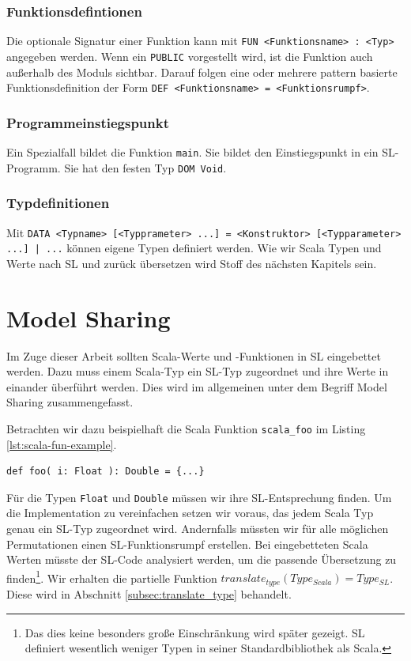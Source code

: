 \documentclass[12pt,bibtotoc]{scrreprt}
\begin{document}
\subsection{Funktionsdefintionen}

Die optionale Signatur einer Funktion kann mit \lstinline!FUN <Funktionsname> : <Typ>! angegeben werden. Wenn ein \lstinline!PUBLIC! vorgestellt wird, ist die Funktion auch außerhalb des Moduls sichtbar. Darauf folgen eine oder mehrere pattern basierte Funktionsdefinition der Form \lstinline!DEF <Funktionsname> = <Funktionsrumpf>!.


\subsection{Programmeinstiegspunkt}

Ein Spezialfall bildet die Funktion \lstinline!main!. Sie bildet den Einstiegspunkt in ein SL-Programm. Sie hat den festen Typ \lstinline!DOM Void!. 

\subsection{Typdefinitionen}

Mit \lstinline!DATA <Typname> [<Typprameter> ...] = <Konstruktor> [<Typparameter> ...] | ...! können eigene Typen definiert werden. Wie wir Scala Typen und Werte nach SL und zurück übersetzen wird Stoff des nächsten Kapitels sein.

\chapter{Model Sharing}
\label{cha:model-sharing}

Im Zuge dieser Arbeit sollten Scala-Werte und -Funktionen in SL eingebettet werden. Dazu muss einem Scala-Typ ein SL-Typ zugeordnet und ihre Werte in einander überführt werden. Dies wird im allgemeinen unter dem Begriff Model Sharing zusammengefasst.

Betrachten wir dazu beispielhaft die Scala Funktion \lstinline!scala_foo! im Listing \ref{lst:scala-fun-example}.

\begin{lstlisting}[caption=Beispielfunktion scala\_foo, label=lst:scala-fun-example]
def foo( i: Float ): Double = {...}
\end{lstlisting}

Für die Typen \lstinline!Float! und \lstinline!Double! müssen wir ihre SL-Entsprechung finden. Um die Implementation zu vereinfachen setzen wir voraus, das jedem Scala Typ genau ein SL-Typ zugeordnet wird. Andernfalls müssten wir für alle möglichen Permutationen einen SL-Funktionsrumpf erstellen. Bei eingebetteten Scala Werten müsste der SL-Code analysiert werden, um die passende Übersetzung zu finden\footnote{Das dies keine besonders große Einschränkung wird später gezeigt. SL definiert wesentlich weniger Typen in seiner Standardbibliothek als Scala. }. Wir erhalten die partielle Funktion $translate_{type}(Type_{Scala}) = Type_{SL}$. Diese wird in Abschnitt \ref{subsec:translate_type} behandelt.
\end{document}
